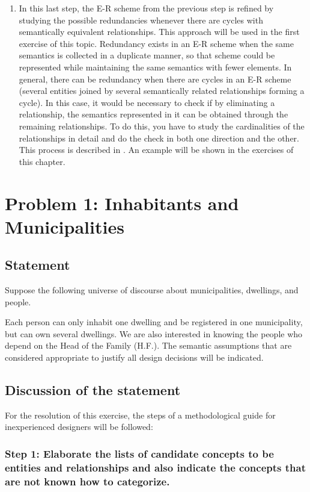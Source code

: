 \documentclass{article}
\numberwithin{figure}{section}
\begin{document}
\begin{enumerate}
    \item In this last step, the E-R scheme from the previous step is refined by studying the possible redundancies whenever there are cycles with semantically equivalent relationships.  This approach will be used in the first exercise of this topic.  Redundancy exists in an E-R scheme when the same semantics is collected in a duplicate manner, so that scheme could be represented while maintaining the same semantics with fewer elements.  In general, there can be redundancy when there are cycles in an E-R scheme (several entities joined by several semantically related relationships forming a cycle).  In this case, it would be necessary to check if by eliminating a relationship, the semantics represented in it can be obtained through the remaining relationships.  To do this, you have to study the cardinalities of the relationships in detail and do the check in both one direction and the other.  This process is described in \cite{demiguel1999fundamentos}.  An example will be shown in the exercises of this chapter.
\end{enumerate}

\section{Problem 1:
Inhabitants and Municipalities
}

\subsection{Statement}

Suppose the following universe of discourse about municipalities, dwellings, and people.

Each person can only inhabit one dwelling and be registered in one municipality, but can own several dwellings.  We are also interested in knowing the people who depend on the Head of the Family (H.F.).  The semantic assumptions that are considered appropriate to justify all design decisions will be indicated.

\subsection{Discussion of the statement}

For the resolution of this exercise, the steps of a methodological guide for inexperienced designers will be followed:

\subsubsection*{Step 1: Elaborate the lists of candidate concepts to be entities and relationships and also indicate the concepts that are not known how to categorize.}
\end{document}

